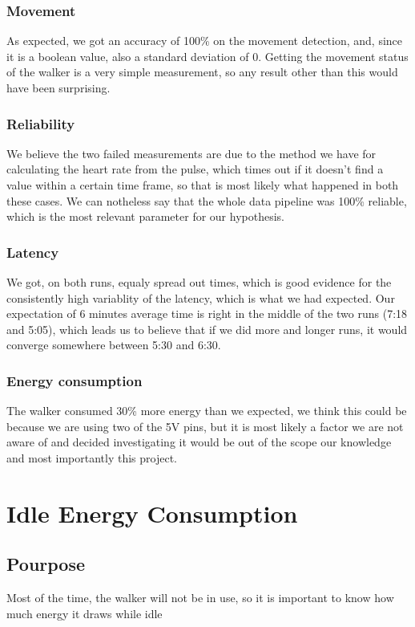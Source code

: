 		\subsubsection{Movement}
			As expected, we got an accuracy of 100\% on the movement detection, and, since it is a boolean value, also a standard deviation of $0$. Getting the movement status of the walker is a very simple measurement, so any result other than this would have been surprising.

		\subsubsection{Reliability}
			We believe the two failed measurements are due to the method we have for calculating the heart rate from the pulse, which times out if it doesn't find a value within a certain time frame, so that is most likely what happened in both these cases. We can notheless say that the whole data pipeline was 100\% reliable, which is the most relevant parameter for our hypothesis.

		\subsubsection{Latency}
			We got, on both runs, equaly spread out times, which is good evidence for the consistently high variablity of the latency, which is what we had expected. Our expectation of 6 minutes average time is right in the middle of the two runs (7:18 and 5:05), which leads us to believe that if we did more and longer runs, it would converge somewhere between 5:30 and 6:30.

		\subsubsection{Energy consumption}
			The walker consumed 30\% more energy than we expected, we think this could be because we are using two of the 5V pins, but it is most likely a factor we are not aware of and decided investigating it would be out of the scope our knowledge and most importantly this project.

\section{Idle Energy Consumption}

	\subsection*{Pourpose}
		Most of the time, the walker will not be in use, so it is important to know how much energy it draws while idle
